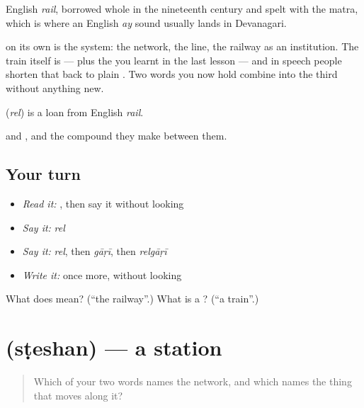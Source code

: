 English \emph{rail}, borrowed whole in the nineteenth century and spelt with the  matra, which is where an English \emph{ay} sound usually lands in Devanagari.

 on its own is the system: the network, the line, the railway as an institution. The train itself is \textbf{} —  plus the  you learnt in the last lesson — and in speech people shorten that back to plain . Two words you now hold combine into the third without anything new.

\begin{cousinweb}
\textbf{} (\emph{rel}) is a loan from English \emph{rail}.
\end{cousinweb}

\begin{grammarlens}[title={What you've built}]
 and , and the compound they make between them.
\end{grammarlens}

\subsection*{Your turn}
\begin{itemize}
\raggedright
  \item \emph{Read it:} \textbf{}, then say it without looking
  \item \emph{Say it:} \emph{rel}
  \item \emph{Say it:} \emph{rel}, then \emph{gāṛī}, then \emph{relgāṛī}
  \item \emph{Write it:}  once more, without looking
\end{itemize}

\begin{tcolorbox}[breakable,colback=teal!4,colframe=teal!35!black,title={Before you move on}]
What does  mean? (\textquotedblleft{}the railway\textquotedblright{}.) What is a ? (\textquotedblleft{}a train\textquotedblright{}.)
\end{tcolorbox}
\section[\texorpdfstring{\hi{स्टेशन} (sṭeshan)}{स्टेशन (sṭeshan)}]{ (sṭeshan) — a station}

\label{lesson:HI-C69-station}



\begin{quote}
Which of your two words names the network, and which names the thing that moves along it?
\end{quote}

